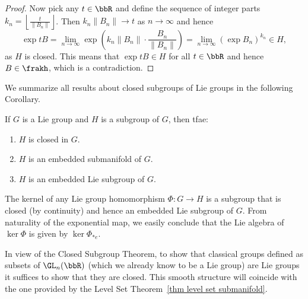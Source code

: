 \begin{proof}
    Now pick any $t\in \bbR$ and define the sequence of integer parts $k_n=\left\lfloor\frac{t}{\lVert B_n\rVert}\right\rfloor$. Then $k_n\lVert B_n\rVert\to t$ as $n\to\infty$ and hence
    \[\exp tB=\lim_{n\to \infty}\exp\left(k_n\lVert B_n\rVert\cdot \frac{B_n}{\lVert B_n\rVert}\right)=\lim_{n\to\infty}\left(\exp B_n\right)^{k_n}\in H,\]
    as $H$ is closed. This means that $\exp tB\in H$ for all $t\in\bbR$ and hence $B\in\frakh$, which is a contradiction.
\end{proof}

We summarize all results about closed subgroups of Lie groups in the following Corollary.

\begin{cor}
    If $G$ is a Lie group and $H$ is a subgroup of $G$, then \gls{tfae}:
    \begin{enumerate}
        \item $H$ is closed in $G$.
        \item $H$ is an embedded submanifold of $G$.
        \item $H$ is an embedded Lie subgroup of $G$.
    \end{enumerate}
\end{cor}

\begin{example}\label{example kernel Lie subgroup}
    The kernel of any Lie group homomorphism $\varPhi:G\to H$ is a subgroup that is closed (by continuity) and hence an embedded Lie subgroup of $G$. From naturality of the exponential map, we easily conclude that the Lie algebra of $\ker \varPhi$ is given by $\ker \varPhi_{\ast e}$.
\end{example}

\begin{example}
    In view of the Closed Subgroup Theorem, to show that classical groups defined as subsets of $\GL_n(\bbR)$ (which we already know to be a Lie group) are Lie groups it suffices to show that they are closed. This smooth structure will coincide with the one provided by the Level Set Theorem~\ref{thm level set submanifold}.
\end{example}


